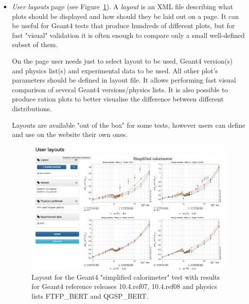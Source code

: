\begin{itemize}
\item \textit{User layouts} page (see Figure~\ref{fig:layouts}). A \textit{layout} is an XML file describing what plots should be displayed and how should they be laid out on a page. It can be useful for Geant4 tests that produce hundreds of different plots, but for fast "visual" validation it is often enough to compare only a small well-defined subset of them. 

On the page user needs just to select layout to be used, Geant4 version(s) and physics list(s) and experimental data to be used. All other plot's parameters should be defined in layout file. It allows performing fast visual comparison of several Geant4 versions/physics lists. It is also possible to produce ration plots to better visualise the difference between different distributions.

Layouts are available "out of the box" for some tests, however users can define and use on the website their own ones.

\begin{figure}[h]
    \centering
    \includegraphics[width=\textwidth,clip]{layout_sc.png}
    \caption{Layout for the Geant4 "simplified calorimeter" test with results for Geant4 reference releases 10.4.ref07, 10.4.ref08 and physics lists FTFP\_BERT and QGSP\_BERT.}
    \label{fig:layouts}
\end{figure}

\end{itemize}

